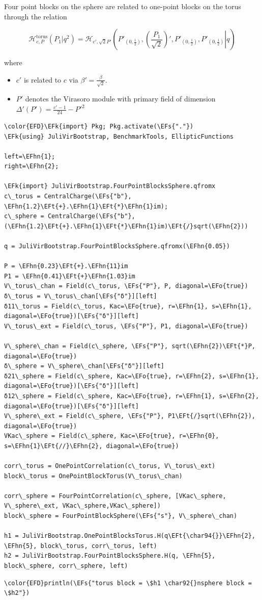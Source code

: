 \documentclass[a4paper]{article}
\numberwithin{equation}{section}
\newcommand{\EFs}[1]{\textcolor{EFs}{#1}} %
\newcommand{\EFk}[1]{\textcolor{EFk}{#1}} %
\newcommand{\EFt}[1]{\textcolor{EFt}{#1}} %
\newcommand{\EFo}[1]{\textcolor{EFo}{#1}} %
\newcommand{\EFhn}[1]{\textcolor{EFhn}{#1}} %
\begin{document}
Four point blocks on the sphere are related to one-point blocks on the torus through the relation

\[
\mathcal H^{\text{torus}}_{c, P}(P_{1} | q^{2}) = \mathcal H_{c', \sqrt{2}P'}\left(\left. P'_{(0,\frac12)}, \left(\frac{P_{1}}{\sqrt{2}}\right)', P'_{(0,\frac12)}, P'_{(0,\frac12)} \right| q \right)
\]

where
\begin{itemize}
\item \(c'\) is related to \(c\) via \(\beta'=\frac\beta{\sqrt 2}\).
\item \(P'\) denotes the Virasoro module with primary field of dimension \(\Delta'(P') = \frac{c'-1}{24} - P'^{2}\)
\end{itemize}

\begin{Code}
\begin{Verbatim}
\color{EFD}\EFk{import} Pkg; Pkg.activate(\EFs{"."})
\EFk{using} JuliVirBootstrap, BenchmarkTools, EllipticFunctions

left=\EFhn{1};
right=\EFhn{2};

\EFk{import} JuliVirBootstrap.FourPointBlocksSphere.qfromx
c\_torus = CentralCharge(\EFs{"b"}, \EFhn{1.2}\EFt{+}.\EFhn{1}\EFt{*}\EFhn{1}im);
c\_sphere = CentralCharge(\EFs{"b"}, (\EFhn{1.2}\EFt{+}.\EFhn{1}\EFt{*}\EFhn{1}im)\EFt{/}sqrt(\EFhn{2}))

q = JuliVirBootstrap.FourPointBlocksSphere.qfromx(\EFhn{0.05})

P = \EFhn{0.23}\EFt{+}.\EFhn{11}im
P1 = \EFhn{0.41}\EFt{+}\EFhn{1.03}im
V\_torus\_chan = Field(c\_torus, \EFs{"P"}, P, diagonal=\EFo{true})
δ\_torus = V\_torus\_chan[\EFs{"δ"}][left]
δ11\_torus = Field(c\_torus, Kac=\EFo{true}, r=\EFhn{1}, s=\EFhn{1}, diagonal=\EFo{true})[\EFs{"δ"}][left]
V\_torus\_ext = Field(c\_torus, \EFs{"P"}, P1, diagonal=\EFo{true})

V\_sphere\_chan = Field(c\_sphere, \EFs{"P"}, sqrt(\EFhn{2})\EFt{*}P, diagonal=\EFo{true})
δ\_sphere = V\_sphere\_chan[\EFs{"δ"}][left]
δ21\_sphere = Field(c\_sphere, Kac=\EFo{true}, r=\EFhn{2}, s=\EFhn{1}, diagonal=\EFo{true})[\EFs{"δ"}][left]
δ12\_sphere = Field(c\_sphere, Kac=\EFo{true}, r=\EFhn{1}, s=\EFhn{2}, diagonal=\EFo{true})[\EFs{"δ"}][left]
V\_sphere\_ext = Field(c\_sphere, \EFs{"P"}, P1\EFt{/}sqrt(\EFhn{2}), diagonal=\EFo{true})
VKac\_sphere = Field(c\_sphere, Kac=\EFo{true}, r=\EFhn{0}, s=\EFhn{1}\EFt{//}\EFhn{2}, diagonal=\EFo{true})

corr\_torus = OnePointCorrelation(c\_torus, V\_torus\_ext)
block\_torus = OnePointBlockTorus(V\_torus\_chan)

corr\_sphere = FourPointCorrelation(c\_sphere, [VKac\_sphere, V\_sphere\_ext, VKac\_sphere,VKac\_sphere])
block\_sphere = FourPointBlockSphere(\EFs{"s"}, V\_sphere\_chan)

h1 = JuliVirBootstrap.OnePointBlocksTorus.H(q\EFt{\char94{}}\EFhn{2}, \EFhn{5}, block\_torus, corr\_torus, left)
h2 = JuliVirBootstrap.FourPointBlocksSphere.H(q, \EFhn{5}, block\_sphere, corr\_sphere, left)
\end{Verbatim}
\end{Code}

\begin{Code}
\begin{Verbatim}
\color{EFD}println(\EFs{"torus block = \$h1 \char92{}nsphere block = \$h2"})
\end{Verbatim}
\end{Code}
\end{document}

